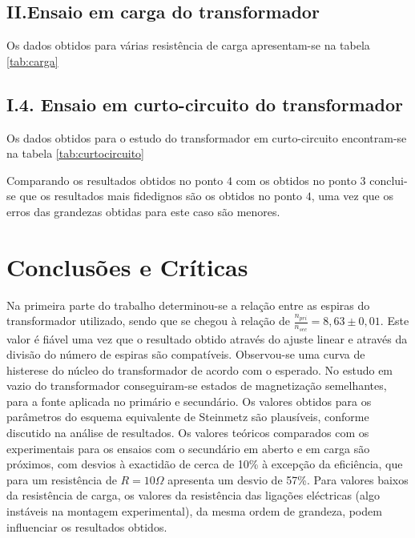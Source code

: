\documentclass[%
  reprint,
  nofootinbib,
  amsmath,amssymb,
  aps,
  10pt,
]{revtex4-1}
\begin{document}
\subsection*{II.Ensaio em carga do transformador}
Os dados obtidos para várias resistência de carga apresentam-se na tabela \ref{tab:carga}




\subsection*{I.4. Ensaio em curto-circuito do transformador}
Os dados obtidos para o estudo do transformador em curto-circuito encontram-se na tabela \ref{tab:curtocircuito}


Comparando os resultados obtidos no ponto $4$ com os obtidos no ponto $3$ conclui-se que os resultados mais fidedignos são os obtidos no ponto $4$, uma vez que os erros das grandezas obtidas para este caso são menores.
\section{Conclusões e Críticas}
\label{s:conclu}
Na primeira parte do trabalho determinou-se a relação entre as espiras do transformador utilizado, sendo que se chegou à relação de $\frac{n_{pri}}{n_{sec}}=8,63\pm0,01$. Este valor é fiável uma vez que o resultado obtido através do ajuste linear e através da divisão do número de espiras são compatíveis.
Observou-se uma curva de histerese do núcleo do transformador de acordo com o esperado.  
No estudo em vazio do transformador conseguiram-se estados de magnetização semelhantes, para a fonte aplicada no primário e secundário. Os valores obtidos para os parâmetros do esquema equivalente de Steinmetz são plausíveis, conforme discutido na análise de resultados.
Os valores teóricos comparados com os experimentais para os ensaios com o secundário em aberto e em carga são próximos, com desvios à exactidão de cerca de 10\% à excepção da eficiência, que para um resistência de $R=10\Omega$ apresenta um desvio de 57\%. Para valores baixos da resistência de carga, os valores da resistência das ligações eléctricas (algo instáveis na montagem experimental), da mesma ordem de grandeza, podem influenciar os resultados obtidos.
\end{document}
